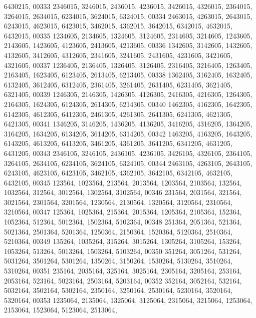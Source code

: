 \begin{DoxyCode}
      6430215,
00333       2346015, 3246015, 2436015, 4236015, 3426015, 4326015, 2364015, 3264015, 2634015, 6234015, 3624015, 
      6324015,
00334       2463015, 4263015, 2643015, 6243015, 4623015, 6423015, 3462015, 4362015, 3642015, 6342015, 4632015, 
      6432015,
00335       1234605, 2134605, 1324605, 3124605, 2314605, 3214605, 1243605, 2143605, 1423605, 4123605, 2413605, 
      4213605,
00336       1342605, 3142605, 1432605, 4132605, 3412605, 4312605, 2341605, 3241605, 2431605, 4231605, 3421605, 
      4321605,
00337       1236405, 2136405, 1326405, 3126405, 2316405, 3216405, 1263405, 2163405, 1623405, 6123405, 2613405, 
      6213405,
00338       1362405, 3162405, 1632405, 6132405, 3612405, 6312405, 2361405, 3261405, 2631405, 6231405, 3621405, 
      6321405,
00339       1246305, 2146305, 1426305, 4126305, 2416305, 4216305, 1264305, 2164305, 1624305, 6124305, 2614305, 
      6214305,
00340       1462305, 4162305, 1642305, 6142305, 4612305, 6412305, 2461305, 4261305, 2641305, 6241305, 4621305, 
      6421305,
00341       1346205, 3146205, 1436205, 4136205, 3416205, 4316205, 1364205, 3164205, 1634205, 6134205, 3614205, 
      6314205,
00342       1463205, 4163205, 1643205, 6143205, 4613205, 6413205, 3461205, 4361205, 3641205, 6341205, 4631205, 
      6431205,
00343       2346105, 3246105, 2436105, 4236105, 3426105, 4326105, 2364105, 3264105, 2634105, 6234105, 3624105, 
      6324105,
00344       2463105, 4263105, 2643105, 6243105, 4623105, 6423105, 3462105, 4362105, 3642105, 6342105, 4632105, 
      6432105,
00345        123564, 1023564,  213564, 2013564, 1203564, 2103564,  132564, 1032564,  312564, 3012564, 1302564, 
      3102564,
00346        231564, 2031564,  321564, 3021564, 2301564, 3201564, 1230564, 2130564, 1320564, 3120564, 2310564, 
      3210564,
00347        125364, 1025364,  215364, 2015364, 1205364, 2105364,  152364, 1052364,  512364, 5012364, 1502364, 
      5102364,
00348        251364, 2051364,  521364, 5021364, 2501364, 5201364, 1250364, 2150364, 1520364, 5120364, 2510364, 
      5210364,
00349        135264, 1035264,  315264, 3015264, 1305264, 3105264,  153264, 1053264,  513264, 5013264, 1503264, 
      5103264,
00350        351264, 3051264,  531264, 5031264, 3501264, 5301264, 1350264, 3150264, 1530264, 5130264, 3510264, 
      5310264,
00351        235164, 2035164,  325164, 3025164, 2305164, 3205164,  253164, 2053164,  523164, 5023164, 2503164, 
      5203164,
00352        352164, 3052164,  532164, 5032164, 3502164, 5302164, 2350164, 3250164, 2530164, 5230164, 3520164, 
      5320164,
00353       1235064, 2135064, 1325064, 3125064, 2315064, 3215064, 1253064, 2153064, 1523064, 5123064, 2513064, 

\end{DoxyCode}
